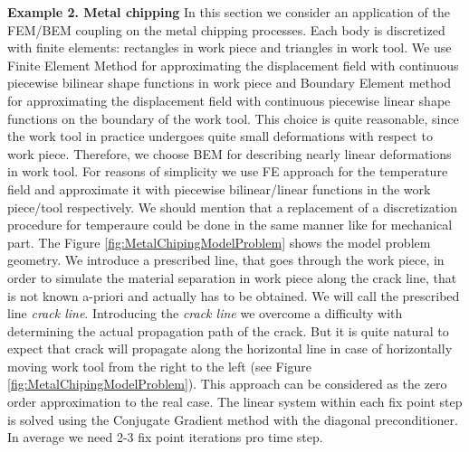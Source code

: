 \textbf{Example 2. Metal chipping}
In this section we consider an application of the FEM/BEM coupling on the metal chipping processes. Each body is discretized with finite elements: rectangles in work piece and triangles in work tool. We use Finite Element Method for approximating the displacement field with continuous piecewise bilinear shape functions in work piece and Boundary Element method for approximating the displacement field with continuous piecewise linear shape functions on the boundary of the  work tool. This choice is quite reasonable, since the work tool in practice undergoes quite small deformations with respect to work piece. Therefore, we choose BEM for describing nearly linear deformations in work tool. For reasons of simplicity we use FE approach for  the temperature field and approximate it with piecewise bilinear/linear functions in the work piece/tool respectively. We should mention that a replacement of a discretization procedure for temperaure could be done in the same manner like for mechanical part. The Figure \ref{fig:MetalChipingModelProblem} shows the  model problem geometry. We introduce a prescribed line, that goes through the work piece, in order to simulate the material separation in work piece along the crack line, that is not known a-priori and actually has to be  obtained. We will  call the prescribed line \textit{crack line}. Introducing the  \textit{crack line} we overcome a difficulty with determining the actual propagation path of the crack. But it is quite natural to expect that crack will propagate along the horizontal line in case of horizontally moving work tool from the right to the left (see Figure \ref{fig:MetalChipingModelProblem}). This approach can be considered as the zero order approximation to the real case. The linear system within each fix point step is solved using the Conjugate Gradient method with the diagonal preconditioner. In average we need 2-3 fix point iterations pro time step.

